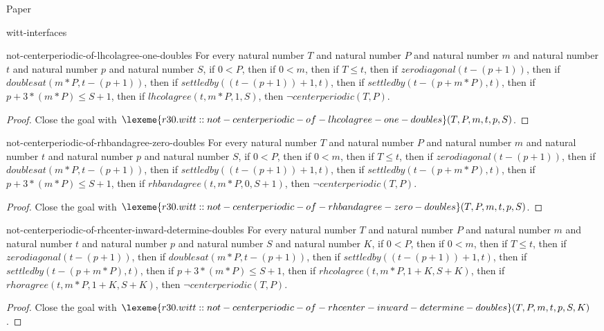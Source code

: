 \begin{lexlean}{Paper}
\begin{section}{witt-interfaces}
  \begin{theorem}{not-centerperiodic-of-lhcolagree-one-doubles}
  For every natural number \(T\) and natural number \(P\) and natural number \(m\) and natural number \(t\) and natural number \(p\) and natural number \(S\), if \(0 < P\), then if \(0 < m\), then if \(T ≤ t\), then if \(zerodiagonal(t - (p + 1))\), then if \(doublesat(m * P, t - (p + 1))\), then if \(settledby((t - (p + 1)) + 1, t)\), then if \(settledby(t - (p + m * P), t)\), then if \(p + 3 * (m * P) ≤ S + 1\), then if \(lhcolagree(t, m * P, 1, S)\), then \(¬centerperiodic(T, P)\).
  \begin{proof}
  Close the goal with \(\lexeme{r30.witt::not-centerperiodic-of-lhcolagree-one-doubles}(T, P, m, t, p, S)\).
  \end{proof}
  \end{theorem}

  \begin{theorem}{not-centerperiodic-of-rhbandagree-zero-doubles}
  For every natural number \(T\) and natural number \(P\) and natural number \(m\) and natural number \(t\) and natural number \(p\) and natural number \(S\), if \(0 < P\), then if \(0 < m\), then if \(T ≤ t\), then if \(zerodiagonal(t - (p + 1))\), then if \(doublesat(m * P, t - (p + 1))\), then if \(settledby((t - (p + 1)) + 1, t)\), then if \(settledby(t - (p + m * P), t)\), then if \(p + 3 * (m * P) ≤ S + 1\), then if \(rhbandagree(t, m * P, 0, S + 1)\), then \(¬centerperiodic(T, P)\).
  \begin{proof}
  Close the goal with \(\lexeme{r30.witt::not-centerperiodic-of-rhbandagree-zero-doubles}(T, P, m, t, p, S)\).
  \end{proof}
  \end{theorem}

  \begin{theorem}{not-centerperiodic-of-rhcenter-inward-determine-doubles}
  For every natural number \(T\) and natural number \(P\) and natural number \(m\) and natural number \(t\) and natural number \(p\) and natural number \(S\) and natural number \(K\), if \(0 < P\), then if \(0 < m\), then if \(T ≤ t\), then if \(zerodiagonal(t - (p + 1))\), then if \(doublesat(m * P, t - (p + 1))\), then if \(settledby((t - (p + 1)) + 1, t)\), then if \(settledby(t - (p + m * P), t)\), then if \(p + 3 * (m * P) ≤ S + 1\), then if \(rhcolagree(t, m * P, 1 + K, S + K)\), then if \(rhoragree(t, m * P, 1 + K, S + K)\), then \(¬centerperiodic(T, P)\).
  \begin{proof}
  Close the goal with \(\lexeme{r30.witt::not-centerperiodic-of-rhcenter-inward-determine-doubles}(T, P, m, t, p, S, K)\).
  \end{proof}
  \end{theorem}


\end{section}
\end{lexlean}
